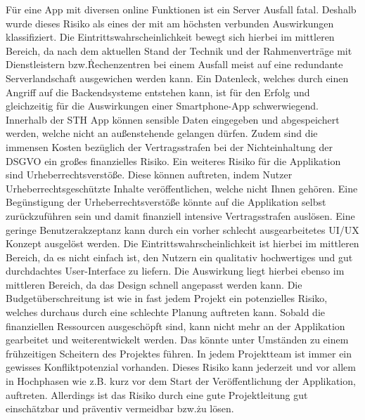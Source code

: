 Für eine App mit diversen online Funktionen ist ein Server Ausfall fatal.
Deshalb wurde dieses Risiko als eines der mit am höchsten verbunden Auswirkungen klassifiziert.
Die Eintrittswahrscheinlichkeit bewegt sich hierbei im mittleren Bereich, da nach dem aktuellen Stand der Technik und der Rahmenverträge mit Dienstleistern bzw.\. Rechenzentren bei einem Ausfall meist auf eine redundante Serverlandschaft ausgewichen werden kann.\newline
Ein Datenleck, welches durch einen Angriff auf die Backendsysteme entstehen kann, ist für den Erfolg und gleichzeitig für die Auswirkungen einer Smartphone-App schwerwiegend.
Innerhalb der STH App können sensible Daten eingegeben und abgespeichert werden, welche nicht an außenstehende gelangen dürfen.
Zudem sind die immensen Kosten bezüglich der Vertragsstrafen bei der Nichteinhaltung der DSGVO ein großes finanzielles Risiko.\newline
Ein weiteres Risiko für die Applikation sind Urheberrechtsverstöße.
Diese können auftreten, indem Nutzer Urheberrechtsgeschützte Inhalte veröffentlichen, welche nicht Ihnen gehören.
Eine Begünstigung der Urheberrechtsverstöße könnte auf die Applikation selbst zurückzuführen sein und damit finanziell intensive Vertragsstrafen auslösen.\newline
Eine geringe Benutzerakzeptanz kann durch ein vorher schlecht ausgearbeitetes UI/UX Konzept ausgelöst werden.
Die Eintrittswahrscheinlichkeit ist hierbei im mittleren Bereich, da es nicht einfach ist, den Nutzern ein qualitativ hochwertiges und gut durchdachtes User-Interface zu liefern.
Die Auswirkung liegt hierbei ebenso im mittleren Bereich, da das Design schnell angepasst werden kann.\newline
Die Budgetüberschreitung ist wie in fast jedem Projekt ein potenzielles Risiko, welches durchaus durch eine schlechte Planung auftreten kann.
Sobald die finanziellen Ressourcen ausgeschöpft sind, kann nicht mehr an der Applikation gearbeitet und weiterentwickelt werden.
Das könnte unter Umständen zu einem frühzeitigen Scheitern des Projektes führen.\newline
In jedem Projektteam ist immer ein gewisses Konfliktpotenzial vorhanden.
Dieses Risiko kann jederzeit und vor allem in Hochphasen wie z.B. kurz vor dem Start der Veröffentlichung der Applikation, auftreten.
Allerdings ist das Risiko durch eine gute Projektleitung gut einschätzbar und präventiv vermeidbar bzw.\. zu lösen.
